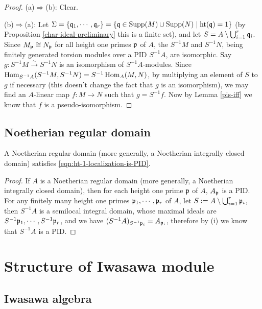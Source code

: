 \begin{proof}
(a)$\Rightarrow$(b): Clear.

(b)$\Rightarrow$(a): Let $\Sigma=\{{\mathfrak{q}}_1,\cdots,{\mathfrak{q}}_r\}
=\{{\mathfrak{q}}\in{\mathrm{Supp}}(M)\cup{\mathrm{Supp}}(N)\mid{\mathrm{ht}}({\mathfrak{q}})=1\}$
(by Proposition \ref{char-ideal-preliminary} this is a finite set),
and let $S=A\setminus\bigcup_{i=1}^r{\mathfrak{q}}_i$.
Since $M_{\mathfrak{p}}\cong N_{\mathfrak{p}}$ for all height one primes ${\mathfrak{p}}$ of $A$,
the $S^{-1}M$ and $S^{-1}N$, being finitely generated torsion modules over
a PID $S^{-1}A$, are isomorphic. Say $g:S^{-1}M\xrightarrow\sim S^{-1}N$
is an isomorphism of $S^{-1}A$-modules.
Since $\operatorname{Hom}_{S^{-1}A}(S^{-1}M,S^{-1}N)=S^{-1}\operatorname{Hom}_A(M,N)$,
by multiplying an element of $S$ to $g$ if necessary
(this doesn't change the fact that $g$ is an isomorphism), we may find
an $A$-linear map $f:M\to N$
such that $g=S^{-1}f$.
Now by Lemma \ref{pis-iff} we know that $f$ is a pseudo-isomorphism.
\end{proof}

\subsection{Noetherian regular domain}

\begin{prop}
\label{regular-domain-is-good}
\leanok
{}
A Noetherian regular domain
(more generally, a Noetherian integrally closed domain)
satisfies \eqref{eqn:ht-1-localization-is-PID}.
\end{prop}

\begin{proof}
\leanok
If $A$ is a Noetherian regular domain
(more generally, a Noetherian integrally closed domain),
then for each height one prime ${\mathfrak{p}}$ of $A$,
$A_{\mathfrak{p}}$ is a PID.
For any finitely many height one primes ${\mathfrak{p}}_1,\cdots,{\mathfrak{p}}_r$ of $A$,
let $S:=A\setminus\bigcup_{i=1}^r{\mathfrak{p}}_i$,
then $S^{-1}A$ is a semilocal integral domain, whose
maximal ideals are $S^{-1}{\mathfrak{p}}_1,\cdots,S^{-1}{\mathfrak{p}}_r$,
and we have $(S^{-1}A)_{S^{-1}{\mathfrak{p}}_i}=A_{{\mathfrak{p}}_i}$,
therefore by (i) we know that $S^{-1}A$ is a PID.
\end{proof}

\section{Structure of Iwasawa module}

\subsection{Iwasawa algebra}

